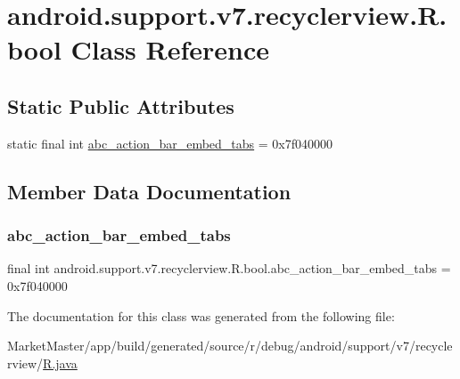 \hypertarget{classandroid_1_1support_1_1v7_1_1recyclerview_1_1R_1_1bool}{}\section{android.\+support.\+v7.\+recyclerview.\+R.\+bool Class Reference}
\label{classandroid_1_1support_1_1v7_1_1recyclerview_1_1R_1_1bool}
\subsection*{Static Public Attributes}
\begin{DoxyCompactItemize}
\item 
static final int \mbox{\hyperlink{classandroid_1_1support_1_1v7_1_1recyclerview_1_1R_1_1bool_a09daaf77c51bf57b0e10b5634f08e2c6}{abc\+\_\+action\+\_\+bar\+\_\+embed\+\_\+tabs}} = 0x7f040000
\end{DoxyCompactItemize}


\subsection{Member Data Documentation}
\mbox{\label{classandroid_1_1support_1_1v7_1_1recyclerview_1_1R_1_1bool_a09daaf77c51bf57b0e10b5634f08e2c6}} 
\subsubsection{\texorpdfstring{abc\+\_\+action\+\_\+bar\+\_\+embed\+\_\+tabs}{abc\_action\_bar\_embed\_tabs}}
{\footnotesize\ttfamily final int android.\+support.\+v7.\+recyclerview.\+R.\+bool.\+abc\+\_\+action\+\_\+bar\+\_\+embed\+\_\+tabs = 0x7f040000\hspace{0.3cm}{\ttfamily [static]}}



The documentation for this class was generated from the following file\+:\begin{DoxyCompactItemize}
\item 
Market\+Master/app/build/generated/source/r/debug/android/support/v7/recyclerview/\mbox{\hyperlink{debug_2android_2support_2v7_2recyclerview_2R_8java}{R.\+java}}\end{DoxyCompactItemize}

